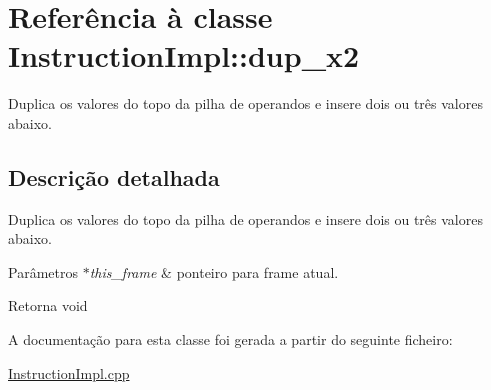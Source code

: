 \hypertarget{class_instruction_impl_1_1dup__x2}{}\section{Referência à classe Instruction\+Impl\+:\+:dup\+\_\+x2}
\label{class_instruction_impl_1_1dup__x2}


Duplica os valores do topo da pilha de operandos e insere dois ou três valores abaixo.  




\subsection{Descrição detalhada}
Duplica os valores do topo da pilha de operandos e insere dois ou três valores abaixo. 


\begin{DoxyParams}{Parâmetros}
{\em $\ast$this\+\_\+frame} & ponteiro para frame atual. \\
\hline
\end{DoxyParams}
\begin{DoxyReturn}{Retorna}
void 
\end{DoxyReturn}


A documentação para esta classe foi gerada a partir do seguinte ficheiro\+:\begin{DoxyCompactItemize}
\item 
\hyperlink{_instruction_impl_8cpp}{Instruction\+Impl.\+cpp}\end{DoxyCompactItemize}
